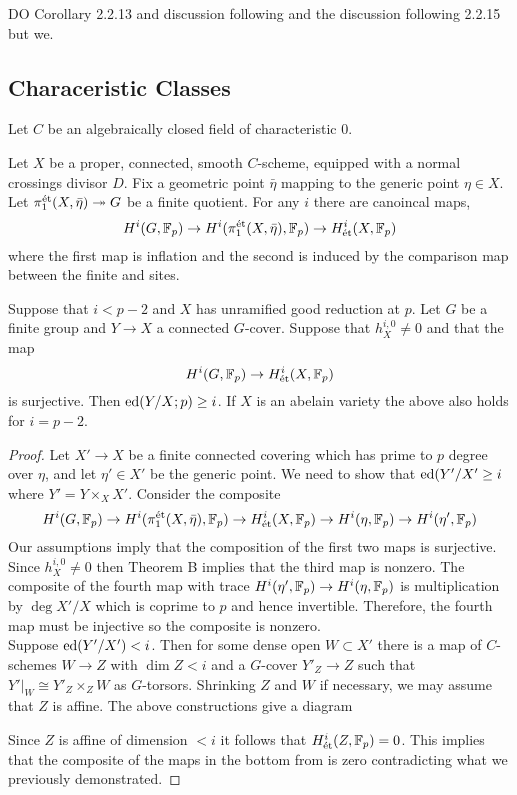 \documentclass[12pt]{article}
\begin{document}
DO Corollary 2.2.13 and discussion following and the discussion following 2.2.15 but we.

\subsection{Characeristic Classes}

Let $C$ be an algebraically closed field of characteristic $0$.

Let $X$ be a proper, connected, smooth $C$-scheme, equipped with a normal crossings divisor $D$. Fix a geometric point $\bar{\eta}$ mapping to the generic point $\eta \in X$. Let $\pi_1^{\text{\'{e}t}}(X, \bar{\eta}) \twoheadrightarrow G$ be a finite quotient. For any $i$ there are canoincal maps,
\[ H^i(G, \mathbb{F}_p) \to H^i(\pi_1^{\text{\'{e}t}}(X, \bar{\eta}), \mathbb{F}_p) \to H^i_{\text{\'{e}t}}(X, \mathbb{F}_p) \]
where the first map is inflation and the second is induced by the comparison map between the finite \etale and \etale sites. 

\begin{theorem}[D]
Suppose that $i < p - 2$ and $X$ has unramified good reduction at $p$. Let $G$ be a finite group and $Y \to X$ a connected $G$-cover. Suppose that $h^{i,0}_X \neq 0$ and that the map
\[ H^i(G, \mathbb{F}_p) \to H_{\text{\'{e}t}}^i(X, \mathbb{F}_p) \]
is surjective. Then $\mathrm{ed}(Y/X ; p) \ge i$. If $X$ is an abelain variety the above also holds for $i = p - 2$.
\end{theorem}

\begin{proof}
Let $X' \to X$ be a finite connected covering which has prime to $p$ degree over $\eta$, and let $\eta' \in X'$ be the generic point. We need to show that $\mathrm{ed}(Y'/X' \ge i$ where $Y' = Y \times_X X'$. Consider the composite
\[ H^i(G, \mathbb{F}_p) \to H^i(\pi_1^{\text{\'{e}t}}(X, \bar{\eta}), \mathbb{F}_p) \to H^i_{\text{\'{e}t}}(X, \mathbb{F}_p) \to H^i(\eta, \mathbb{F}_p) \to H^i(\eta', \mathbb{F}_p) \]
Our assumptions imply that the composition of the first two maps is surjective. Since $h_X^{i,0} \neq 0$ then Theorem B implies that the third map is nonzero. The composite of the fourth map with trace $H^i(\eta', \mathbb{F}_p) \to H^i(\eta, \mathbb{F}_p)$ is multiplication by $\deg{X'/X}$ which is coprime to $p$ and hence invertible. Therefore, the fourth map must be injective so the composite is nonzero. 
\bigskip\\
Suppose $\mathrm{ed}(Y'/X') < i$. Then for some dense open $W \subset X'$ there is a map of $C$-schemes $W \to Z$ with $\dim{Z} < i$ and a $G$-cover $Y'_Z \to Z$ such that $Y'|_W \cong Y'_Z \times_Z W$ as $G$-torsors. Shrinking $Z$ and $W$ if necessary, we may assume that $Z$ is affine. The above constructions give a diagram
\begin{center}
\end{center}
Since $Z$ is affine of dimension $< i$ it follows that $H^i_{\text{\'{e}t}}(Z, \mathbb{F}_p) = 0$. This implies that the composite of the maps in the bottom from is zero contradicting what we previously demonstrated.
\end{proof}
\end{document}
